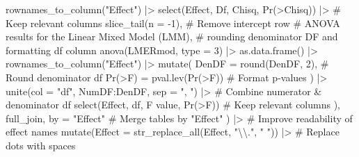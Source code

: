 \documentclass[
  bookmarksnumbered]{article}
\newenvironment{Shaded}{\begin{snugshade}}{\end{snugshade}}
\newcommand{\AttributeTok}[1]{\textcolor[rgb]{0.80,0.80,0.80}{#1}}
\newcommand{\CommentTok}[1]{\textcolor[rgb]{0.50,0.62,0.50}{#1}}
\newcommand{\DecValTok}[1]{\textcolor[rgb]{0.86,0.86,0.80}{#1}}
\newcommand{\FunctionTok}[1]{\textcolor[rgb]{0.94,0.94,0.56}{#1}}
\newcommand{\NormalTok}[1]{\textcolor[rgb]{0.80,0.80,0.80}{#1}}
\newcommand{\OtherTok}[1]{\textcolor[rgb]{0.94,0.94,0.56}{#1}}
\newcommand{\SpecialCharTok}[1]{\textcolor[rgb]{0.86,0.64,0.64}{#1}}
\newcommand{\StringTok}[1]{\textcolor[rgb]{0.80,0.58,0.58}{#1}}
\begin{document}
\begin{Shaded}
\begin{Highlighting}[]
          \FunctionTok{rownames\_to\_column}\NormalTok{(}\StringTok{"Effect"}\NormalTok{) }\SpecialCharTok{|\textgreater{}}
          \FunctionTok{select}\NormalTok{(Effect, Df, Chisq, }\StringTok{\textasciigrave{}}\AttributeTok{Pr(\textgreater{}Chisq)}\StringTok{\textasciigrave{}}\NormalTok{) }\SpecialCharTok{|\textgreater{}} \CommentTok{\# Keep relevant columns}
          \FunctionTok{slice\_tail}\NormalTok{(}\AttributeTok{n =} \SpecialCharTok{{-}}\DecValTok{1}\NormalTok{), }\CommentTok{\# Remove intercept row}
        \CommentTok{\# ANOVA results for the Linear Mixed Model (LMM),}
        \CommentTok{\# rounding denominator DF and formatting df column}
        \FunctionTok{anova}\NormalTok{(LMERmod, }\AttributeTok{type =} \DecValTok{3}\NormalTok{) }\SpecialCharTok{|\textgreater{}}
          \FunctionTok{as.data.frame}\NormalTok{() }\SpecialCharTok{|\textgreater{}}
          \FunctionTok{rownames\_to\_column}\NormalTok{(}\StringTok{"Effect"}\NormalTok{) }\SpecialCharTok{|\textgreater{}}
          \FunctionTok{mutate}\NormalTok{(}
            \AttributeTok{DenDF =} \FunctionTok{round}\NormalTok{(DenDF, }\DecValTok{2}\NormalTok{), }\CommentTok{\# Round denominator df}
            \StringTok{\textasciigrave{}}\AttributeTok{Pr(\textgreater{}F)}\StringTok{\textasciigrave{}} \OtherTok{=} \FunctionTok{pval.lev}\NormalTok{(}\StringTok{\textasciigrave{}}\AttributeTok{Pr(\textgreater{}F)}\StringTok{\textasciigrave{}}\NormalTok{) }\CommentTok{\# Format p{-}values}
\NormalTok{          ) }\SpecialCharTok{|\textgreater{}}
          \FunctionTok{unite}\NormalTok{(}\AttributeTok{col =} \StringTok{"df"}\NormalTok{, NumDF}\SpecialCharTok{:}\NormalTok{DenDF, }\AttributeTok{sep =} \StringTok{", "}\NormalTok{) }\SpecialCharTok{|\textgreater{}} \CommentTok{\# Combine numerator \& denominator df}
          \FunctionTok{select}\NormalTok{(Effect, df, }\StringTok{\textasciigrave{}}\AttributeTok{F value}\StringTok{\textasciigrave{}}\NormalTok{, }\StringTok{\textasciigrave{}}\AttributeTok{Pr(\textgreater{}F)}\StringTok{\textasciigrave{}}\NormalTok{) }\CommentTok{\# Keep relevant columns}
\NormalTok{      ),}
\NormalTok{      full\_join,}
      \AttributeTok{by =} \StringTok{"Effect"} \CommentTok{\# Merge tables by "Effect"}
\NormalTok{    ) }\SpecialCharTok{|\textgreater{}}
    \CommentTok{\# Improve readability of effect names}
    \FunctionTok{mutate}\NormalTok{(}\AttributeTok{Effect =} \FunctionTok{str\_replace\_all}\NormalTok{(Effect, }\StringTok{"}\SpecialCharTok{\textbackslash{}\textbackslash{}}\StringTok{."}\NormalTok{, }\StringTok{" "}\NormalTok{)) }\SpecialCharTok{|\textgreater{}} \CommentTok{\# Replace dots with spaces}

\end{Highlighting}
\end{Shaded}
\end{document}

